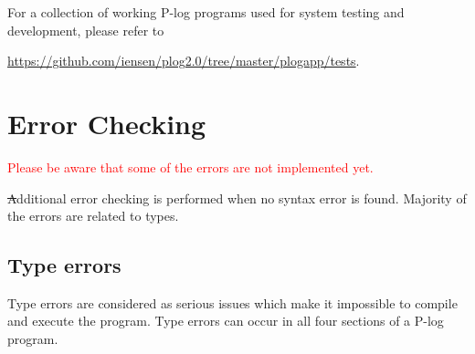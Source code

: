 \documentclass[12pt, letterpaper]{article}
\begin{document}
 For a collection of working P-log programs used for system testing and development, please refer to
 \begin{center}
\url{https://github.com/iensen/plog2.0/tree/master/plogapp/tests}.
 \end{center}
 

 \section{Error Checking}

 \textcolor{red}{Please be aware that some of the errors are not implemented yet.}

\st
Additional error checking is performed when no syntax error is found. Majority of the errors are related to types.
\subsection{Type errors}
Type errors are considered as serious issues which make it  impossible to compile and execute the program.
Type errors can occur in all four sections of a P-log program.
\end{document}
